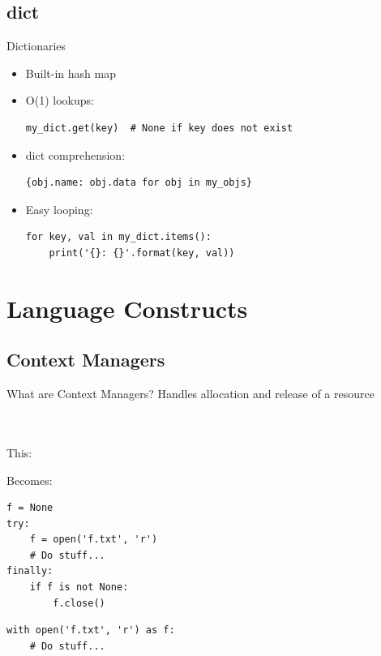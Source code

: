 \documentclass[11pt]{beamer}
\newcommand{\emptyline}{$ $\\}
\begin{document}
\subsection{dict}
\begin{frame}[fragile]{Dictionaries}
    \begin{itemize}
        \item Built-in hash map

        \item O(1) lookups:
        \begin{lstlisting}
my_dict.get(key)  # None if key does not exist
        \end{lstlisting}

        \item dict comprehension:
        \begin{lstlisting}
{obj.name: obj.data for obj in my_objs}
        \end{lstlisting}

        \item Easy looping:
        \begin{lstlisting}
for key, val in my_dict.items():
    print('{}: {}'.format(key, val))
        \end{lstlisting}
    \end{itemize}
\end{frame}

\section{Language Constructs}
\subsection{Context Managers}
\begin{frame}[fragile]{What are Context Managers?}
    Handles allocation and release of a resource \\
    \emptyline
    \emptyline

    \begin{minipage}{0.45\linewidth}
        This:
    \end{minipage}
    \begin{minipage}{0.45\linewidth}
        Becomes:
    \end{minipage}

    \begin{minipage}{0.45\linewidth}
        \begin{lstlisting}
f = None
try:
    f = open('f.txt', 'r')
    # Do stuff...
finally:
    if f is not None:
        f.close()
        \end{lstlisting}
    \end{minipage}
    \pause
    \begin{minipage}{0.45\linewidth}
        \begin{lstlisting}
with open('f.txt', 'r') as f:
    # Do stuff...
        \end{lstlisting}
    \end{minipage}
\end{frame}
\end{document}

